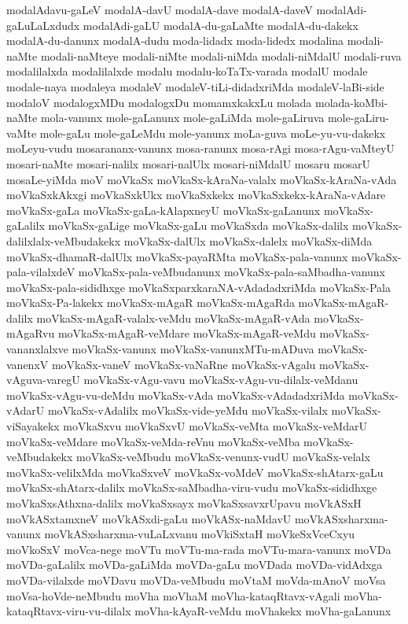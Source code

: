 {modalAdavu-gaLeV
modalA-davU
modalA-dave
modalA-daveV
modalAdi-gaLuLaLxdudx
modalAdi-gaLU
modalA-du-gaLaMte
modalA-du-dakekx
modalA-du-danunx
modalA-dudu
moda-lidadx
moda-lidedx
modalina
modali-naMte
modali-naMteye
modali-niMte
modali-niMda
modali-niMdalU
modali-ruva
modalilalxda
modalilalxde
modalu
modalu-koTaTx-varada
modalU
modale
modale-naya
modaleya
modaleV
modaleV-tiLi-didadxriMda
modaleV-laBi-side
modaloV
modalogxMDu
modalogxDu
momamxkakxLu
molada
molada-koMbi-naMte
mola-vanunx
mole-gaLanunx
mole-gaLiMda
mole-gaLiruva
mole-gaLiru-vaMte
mole-gaLu
mole-gaLeMdu
mole-yanunx
moLa-guva
moLe-yu-vu-dakekx
moLeyu-vudu
mosarananx-vanunx
mosa-ranunx
mosa-rAgi
mosa-rAgu-vaMteyU
mosari-naMte
mosari-nalilx
mosari-nalUlx
mosari-niMdalU
mosaru
mosarU
mosaLe-yiMda
moV
moVkaSx
moVkaSx-kAraNa-valalx
moVkaSx-kAraNa-vAda
moVkaSxkAkxgi
moVkaSxkUkx
moVkaSxkekx
moVkaSxkekx-kAraNa-vAdare
moVkaSx-gaLa
moVkaSx-gaLa-kAlapxneyU
moVkaSx-gaLanunx
moVkaSx-gaLalilx
moVkaSx-gaLige
moVkaSx-gaLu
moVkaSxda
moVkaSx-dalilx
moVkaSx-dalilxlalx-veMbudakekx
moVkaSx-dalUlx
moVkaSx-dalelx
moVkaSx-diMda
moVkaSx-dhamaR-dalUlx
moVkaSx-payaRMta
moVkaSx-pala-vanunx
moVkaSx-pala-vilalxdeV
moVkaSx-pala-veMbudanunx
moVkaSx-pala-saMbadha-vanunx
moVkaSx-pala-sididhxge
moVkaSxparxkaraNA-vAdadadxriMda
moVkaSx-Pala
moVkaSx-Pa-lakekx
moVkaSx-mAgaR
moVkaSx-mAgaRda
moVkaSx-mAgaR-dalilx
moVkaSx-mAgaR-valalx-veMdu
moVkaSx-mAgaR-vAda
moVkaSx-mAgaRvu
moVkaSx-mAgaR-veMdare
moVkaSx-mAgaR-veMdu
moVkaSx-vananxlalxve
moVkaSx-vanunx
moVkaSx-vanunxMTu-mADuva
moVkaSx-vanenxV
moVkaSx-vaneV
moVkaSx-vaNaRne
moVkaSx-vAgalu
moVkaSx-vAguva-varegU
moVkaSx-vAgu-vavu
moVkaSx-vAgu-vu-dilalx-veMdanu
moVkaSx-vAgu-vu-deMdu
moVkaSx-vAda
moVkaSx-vAdadadxriMda
moVkaSx-vAdarU
moVkaSx-vAdalilx
moVkaSx-vide-yeMdu
moVkaSx-vilalx
moVkaSx-viSayakekx
moVkaSxvu
moVkaSxvU
moVkaSx-veMta
moVkaSx-veMdarU
moVkaSx-veMdare
moVkaSx-veMda-reVnu
moVkaSx-veMba
moVkaSx-veMbudakekx
moVkaSx-veMbudu
moVkaSx-venunx-vudU
moVkaSx-velalx
moVkaSx-velilxMda
moVkaSxveV
moVkaSx-voMdeV
moVkaSx-shAtarx-gaLu
moVkaSx-shAtarx-dalilx
moVkaSx-saMbadha-viru-vudu
moVkaSx-sididhxge
moVkaSxsAthxna-dalilx
moVkaSxsayx
moVkaSxsavxrUpavu
moVkASxH
moVkASxtamxneV
moVkASxdi-gaLu
moVkASx-naMdavU
moVkASxsharxma-vanunx
moVkASxsharxma-vuLaLxvanu
moVkiSxtaH
moVkeSxVceCxyu
moVkoSxV
moVca-nege
moVTu
moVTu-ma-rada
moVTu-mara-vanunx
moVDa
moVDa-gaLalilx
moVDa-gaLiMda
moVDa-gaLu
moVDada
moVDa-vidAdxga
moVDa-vilalxde
moVDavu
moVDa-veMbudu
moVtaM
moVda-mAnoV
moVsa
moVsa-hoVde-neMbudu
moVha
moVhaM
moVha-kataqRtavx-vAgali
moVha-kataqRtavx-viru-vu-dilalx
moVha-kAyaR-veMdu
moVhakekx
moVha-gaLanunx
}

